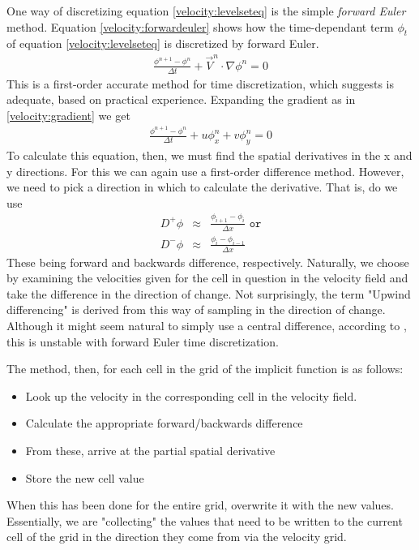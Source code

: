One way of discretizing equation \ref{velocity:levelseteq} is the simple \emph{forward Euler} method. Equation \vref{velocity:forwardeuler} shows how the time-dependant term $\phi_t$ of equation \ref{velocity:levelseteq} is discretized by forward Euler. 
\begin{eqnarray}
\label{velocity:forwardeuler}
\frac{\phi^{n+1}-\phi^n}{\Delta t}+\vec{V}^n\cdot\nabla\phi^n = 0
\end{eqnarray}
This is a first-order accurate method for time discretization, which  suggests is adequate, based on practical experience.
Expanding the gradient as in \vref{velocity:gradient} we get
\begin{eqnarray}
\label{velocity:forwardeuler}
\frac{\phi^{n+1}-\phi^n}{\Delta t}+u\phi_{x}^n + v\phi_{y}^n = 0
\end{eqnarray}
To calculate this equation, then, we must find the spatial derivatives in the x and y directions. For this we can again use a first-order difference method. However, we need to pick a direction in which to calculate the derivative. That is, do we use
\begin{eqnarray}
D^+\phi &\approx & \frac{\phi_{i+1} - \phi_i}{\Delta x} \texttt{ or}\\
D^-\phi &\approx & \frac{\phi_i - \phi_{i-1}}{\Delta x}
\end{eqnarray}
These being forward and backwards difference, respectively. Naturally, we choose by examining the velocities given for the cell in question in the velocity field and take the difference in the direction of change. Not surprisingly, the term "Upwind differencing" is derived from this way of sampling in the direction of change. 
Although it might seem natural to simply use a central difference, according to , this is unstable with forward Euler time discretization.

The method, then, for each cell in the grid of the implicit function is as follows:
\begin{itemize}
\item Look up the velocity in the corresponding cell in the velocity field.
\item Calculate the appropriate forward/backwards difference
\item From these, arrive at the partial spatial derivative
\item Store the new cell value
\end{itemize}
When this has been done for the entire grid, overwrite it with the new values.
Essentially, we are "collecting" the values that need to be written to the current cell of the grid in the direction they come from via the velocity grid.

